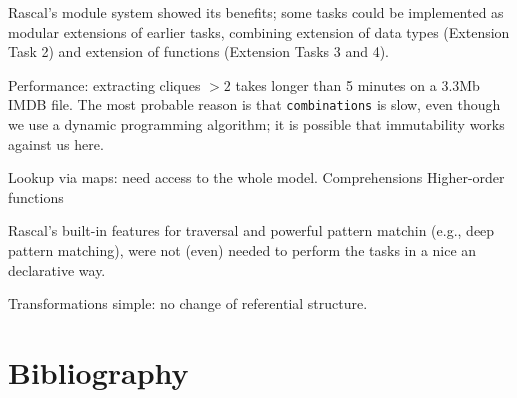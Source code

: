 \documentclass[submission,copyright,creativecommons]{eptcs}
\begin{document}
Rascal's module system showed its benefits; some tasks could be
implemented as modular extensions of earlier tasks, combining
extension of data types (Extension Task 2) and extension of functions
(Extension Tasks 3 and 4).

Performance: extracting cliques $> 2$ takes longer than 5 minutes on a
3.3Mb IMDB file. The most probable reason is that
\texttt{combinations} is slow, even though we use a dynamic
programming algorithm; it is possible that immutability works against
us here.


Lookup via maps: need access to the whole model.
Comprehensions
Higher-order functions

Rascal's built-in features for traversal and powerful pattern matchin (e.g., deep pattern matching), were not (even) needed to perform the tasks in a nice an declarative way. 

Transformations simple: no change of referential structure. 

\section{Bibliography}

\nocite{*}


\end{document}

